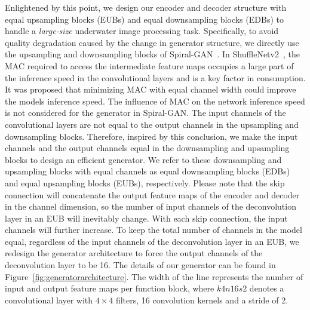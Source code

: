 \documentclass[utf8]{FrontiersinHarvard} %
\begin{document}
Enlightened by this point, we design our encoder and decoder structure with equal upsampling blocks (EUBs) and equal downsampling blocks (EDBs) to handle a \textit{large-size} underwater image processing task. Specifically, to avoid quality degradation caused by the change in generator structure, we directly use the upsampling and downsampling blocks of Spiral-GAN~\citep{2020Underwater}. In ShuffleNetv2~\citep{2018ShuffleNet}, the MAC required to access the intermediate feature maps occupies a large part of the inference speed in the convolutional layers and is a key factor in consumption. It was proposed that minimizing MAC with equal channel width could improve the models inference speed. The influence of MAC on the network inference speed is not considered for the generator in Spiral-GAN. The input channels of the convolutional layers are not equal to the output channels in the upsampling and downsampling blocks. Therefore, inspired by this conclusion, we make the input channels and the output channels equal in the downsampling and upsampling blocks to design an efficient generator. We refer to these downsampling and upsampling blocks with equal channels as equal downsampling blocks (EDBs) and equal upsampling blocks (EUBs), respectively. Please note that the skip connection will concatenate the output feature maps of the encoder and decoder in the channel dimension, so the number of input channels of the deconvolution layer in an EUB will inevitably change. With each skip connection, the input channels will further increase. To keep the total number of channels in the model equal, regardless of the input channels of the deconvolution layer in an EUB, we redesign the generator architecture to force the output channels of the deconvolution layer to be 16. The details of our generator can be found in Figure~\ref{fig:generatorarchitecture}. The width of the line represents the number of input and output feature maps per function block, where $k4n16s2$ denotes a convolutional layer with $4\times4$ filters, 16 convolution kernels and a stride of 2.
\end{document}
